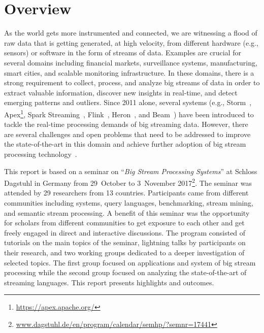 \section{Overview}\label{sec:overview}

As the world gets more instrumented and connected, we are witnessing a
flood of raw data that is getting generated, at high velocity,
from different hardware (e.g., sensors) or software in the form of
streams of data. Examples are crucial for several
domains including financial markets, surveillance
systems, manufacturing, smart cities, and scalable monitoring
infrastructure. In these domains, there is a strong
requirement to collect, process, and analyze big streams of data in
order to extract valuable information, discover new insights in
real-time, and detect emerging patterns and outliers. Since 2011
alone, several systems (e.g.,
\textsf{\small Storm}~\cite{toshniwal_et_al_2014},
\textsf{\small Apex}\footnote{\url{https://apex.apache.org/}},
\textsf{\small Spark Streaming}~\cite{zaharia_et_al_2013},
\textsf{\small Flink}~\cite{carbone_et_al_2015},
\textsf{\small Heron}~\cite{kulkarni_et_al_2015}, and
\textsf{\small Beam}~\cite{43864}) have
been introduced to tackle the real-time processing demands of big
streaming data. However, there are several challenges and open
problems that need to be addressed to improve the state-of-the-art in
this domain and achieve further adoption of big stream processing
technology~\cite{sakr2016big}.

This report is based on a seminar on ``\emph{Big Stream
  Processing Systems}'' at Schloss Dagstuhl in Germany
from 29~October to 3~November 2017\footnote{\url{www.dagstuhl.de/en/program/calendar/semhp/?semnr=17441}}.
%
The seminar was attended by 29 researchers from 13 countries.
Participants came from different communities including systems, query
languages, benchmarking, stream mining, and semantic stream
processing. A benefit of this seminar was the opportunity for scholars
from different communities to get exposure to each other and get
freely engaged in direct and interactive discussions. The program
consisted of tutorials on the main topics of the seminar, lightning
talks by participants on their research, and two working groups
dedicated to a deeper investigation of selected topics.  The first
group focused on applications and system of big stream processing
while the second group focused on analyzing the state-of-the-art of
streaming languages. This report presents highlights and outcomes.
